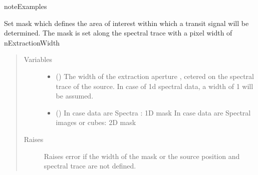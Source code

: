 \documentclass[a4paper,10pt,english]{sphinxmanual}
\begin{document}
\begin{fulllineitems}
\begin{fulllineitems}
\begin{sphinxadmonition}{note}{Examples}
%
\begin{sphinxVerbatim}[commandchars=\\\{\}]
\end{sphinxVerbatim}
\end{sphinxadmonition}

\end{fulllineitems}


\begin{fulllineitems}
\label{\detokenize{cascade.TSO:cascade.TSO.TSO.TSOSuite.set_extraction_mask}}
Set mask which defines the area of interest within which
a transit signal will be determined. The mask is set along the
spectral trace with a pixel width of nExtractionWidth
\begin{quote}\begin{description}
\item[{Variables}] \leavevmode\begin{itemize}
\item {} 
 () \textendash{} The width of the extraction aperture , cetered on the
spectral trace of the source. In case of 1d spectral data, a
width of 1 will be assumed.

\item {} 
 () \textendash{} In case data are Spectra : 1D mask
In case data are Spectral images or cubes: 2D mask

\end{itemize}

\item[{Raises}] \leavevmode
{} \textendash{} Raises error if the width of the mask or the source position
and spectral trace are not defined.

\end{description}\end{quote}


\end{fulllineitems}
\end{fulllineitems}
\end{document}
